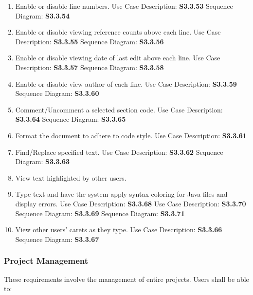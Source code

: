 \documentclass[twoside,letterpaper]{article}
\begin{document}
	\begin{enumerate}
		\item Enable or disable line numbers.
			\subitem Use Case Description: \textbf{S3.3.53}
			\subitem Sequence Diagram: \textbf{S3.3.54}
		\item Enable or disable viewing reference counts above each line.
			\subitem Use Case Description: \textbf{S3.3.55}
			\subitem Sequence Diagram: \textbf{S3.3.56}
		\item Enable or disable viewing date of last edit above each line.
			\subitem Use Case Description: \textbf{S3.3.57}
			\subitem Sequence Diagram: \textbf{S3.3.58}
		\item Enable or disable view author of each line.
			\subitem Use Case Description: \textbf{S3.3.59}
			\subitem Sequence Diagram: \textbf{S3.3.60}
		\item Comment/Uncomment a selected section code.
			\subitem Use Case Description: \textbf{S3.3.64}
			\subitem Sequence Diagram: \textbf{S3.3.65}
		\item Format the document to adhere to code style.
			\subitem Use Case Description: \textbf{S3.3.61}
		\item Find/Replace specified text.
			\subitem Use Case Description: \textbf{S3.3.62}
			\subitem Sequence Diagram: \textbf{S3.3.63}
		\item View text highlighted by other users.
		\item Type text and have the system apply syntax coloring for Java files and display errors.
			\subitem Use Case Description: \textbf{S3.3.68}
			\subitem Use Case Description: \textbf{S3.3.70}
			\subitem Sequence Diagram: \textbf{S3.3.69}
			\subitem Sequence Diagram: \textbf{S3.3.71}
		\item View other users' carets as they type.
			\subitem Use Case Description: \textbf{S3.3.66}
			\subitem Sequence Diagram: \textbf{S3.3.67}
	\end{enumerate}
	
	\subsubsection{Project Management}
	
	These requirements involve the management of entire projects. Users shall be able to:
	
\end{document}
